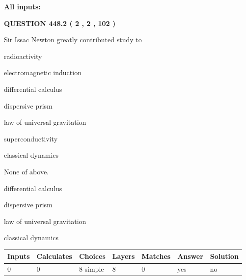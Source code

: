 \documentclass[12pt]{article}
\begin{document}
   
   
   
\noindent{}
   
   
   
   
\noindent\vspace{0.1in}\hspace{-0.08in} {\textbf{\Large{All inputs: }}}
   
   
  
\vspace{0.2in}
  
{\textbf{\Large{QUESTION
448.2 
 ( 2 , 2 , 102 )
}}}
  
  
Sir Issac Newton greatly contributed study to
 
 
radioactivity
 
 
electromagnetic induction
 
 
differential calculus
 
 
dispersive prism
 
 
law of universal gravitation
 
 
superconductivity
 
 
classical dynamics
 
 
 None of above.
 
 
\noindent{}
 
 
differential calculus
 
 
dispersive prism
 
 
law of universal gravitation
 
 
classical dynamics
 
 
\noindent{}
 
 
   
   
   
   
\noindent\begin{tabular}{|l|l|l|l|l|l|l|}
 \hline
Inputs & Calculates & Choices & Layers & Matches & Answer & Solution \\ \hline
 0  & 
 0  & 
 8
  simple  
  & 
 8  & 
 0  & 
  yes & 
  no 
  \\ \hline
 \end{tabular}
   
\end{document}

